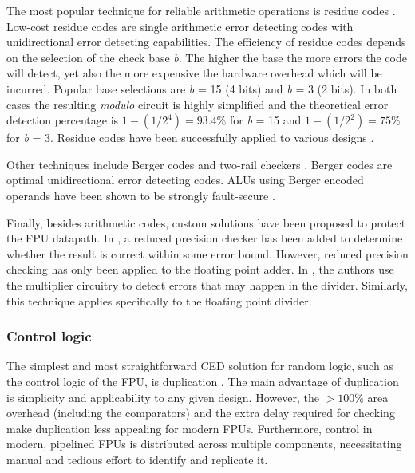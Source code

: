 \documentclass[12pt]{yalephd}
\begin{document}
The most popular technique for reliable arithmetic operations is residue codes \cite{avizienis1973arithmetic, kinoshita1974floating, sasaki1968basis}. Low-cost residue codes are single arithmetic error detecting codes with unidirectional error detecting capabilities. The efficiency of residue codes depends on the selection of the check base {\em b}. The higher the base the more errors the code will detect, yet also the more expensive the hardware overhead which will be incurred. Popular base selections are {\em b} = 15 (4 bits) and {\em b} = 3 (2 bits). In both cases the resulting {\em modulo} circuit is highly simplified and the theoretical error detection percentage is $1-(1/2^4) = 93.4\%$ for {\em b} = 15 and $1-(1/2^2) = 75\%$ for {\em b} = 3. Residue codes have been successfully applied to various designs \cite{lo1994reliable, anderson1973design, avizienis1971star}.

Other techniques include Berger codes \cite{berger1961note, marouf1978design} and two-rail checkers \cite{anderson1973design, nicolaidis1989self}. Berger codes are optimal unidirectional error detecting codes. ALUs using Berger encoded operands have been shown to be strongly fault-secure \cite{lo1994reliable, lo1992sfs}.

Finally, besides arithmetic codes, custom solutions have been proposed to protect the FPU datapath. In \cite{ECS09}, a reduced precision checker has been added to determine whether the result is correct within some error bound. However, reduced precision checking has only been applied to the floating point adder. In \cite{shekarian2008low}, the authors use the multiplier circuitry to detect errors that may happen in the divider. Similarly, this technique applies specifically to the floating point divider.

\subsubsection{Control logic}

The simplest and most straightforward CED solution for random logic, such as the control logic of the FPU, is duplication \cite{TSC692}. The main advantage of duplication is simplicity and applicability to any given design. However, the $>100\%$ area overhead (including the comparators) and the extra delay required for checking make duplication less appealing for modern FPUs. Furthermore, control in modern, pipelined FPUs is distributed across multiple components, necessitating manual and tedious effort to identify and replicate it.
\end{document}
